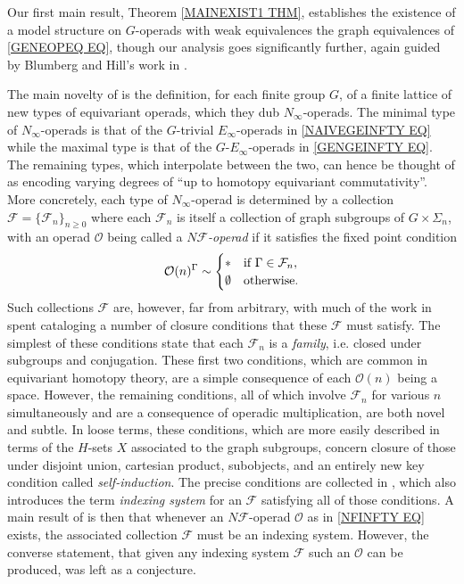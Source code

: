 \documentclass[a4paper,10pt
,draft
]{article}%
\numberwithin{equation}{section}
\numberwithin{figure}{section}
\theoremstyle{definition} %
\newcommand{\set}[1]{\left\{#1\right\}}%
\renewcommand{\O}{\ensuremath{\mathcal O}}
\newcommand{\1}{\ensuremath{\mathbbm 1}}%
\begin{document}
Our first main result, Theorem \ref{MAINEXIST1 THM}, 
establishes the existence of a model structure on $G$-operads with weak equivalences the graph equivalences of \eqref{GENEOPEQ EQ},
though our analysis goes significantly further, again guided by Blumberg and Hill's work in \cite{BH15}.

The main novelty of \cite{BH15} is the definition, for each finite group $G$, of a finite lattice of new types of equivariant operads, which they dub $N_{\infty}$-operads.
The minimal type of $N_{\infty}$-operads is that of the 
$G$-trivial $E_{\infty}$-operads in \eqref{NAIVEGEINFTY EQ} 
while the maximal type is that of the $G$-$E_{\infty}$-operads in \eqref{GENGEINFTY EQ}.
The remaining types, which interpolate between 
the two,
can hence be thought of as encoding varying degrees of ``up to homotopy equivariant commutativity''.
More concretely, each type of $N_{\infty}$-operad is determined by a collection
$\mathcal{F} = \{\mathcal{F}_n\}_{n \geq 0}$
\index{F@$\mathcal F = \set{\mathcal F_n}_{n \geq 0}$}
where each $\mathcal{F}_n$ is itself a collection of graph subgroups of $G \times \Sigma_n$,
with an operad $\O$ being called a
\textit{$N \mathcal{F}$-operad} if it satisfies the fixed point condition
\begin{equation}\label{NFINFTY EQ}
	\O(n)^{\Gamma} \sim 
\begin{cases}
	\** & \text{if } \Gamma \in \mathcal{F}_n,
\\
	\emptyset & \text{otherwise}.
\end{cases}
\end{equation}
Such collections $\mathcal{F}$ are, however, far from arbitrary, with much of the work in \cite[\S 3]{BH15} spent cataloging a number of closure conditions that these $\mathcal{F}$ must satisfy.
The simplest of these conditions
state that each $\mathcal{F}_n$ is a \textit{family}, i.e. closed under subgroups and conjugation. These first two conditions, which are common in equivariant homotopy theory,
are a simple consequence of each $\O(n)$ being a space.
However, the remaining conditions, 
all of which involve $\mathcal{F}_n$ for various $n$ simultaneously and are a consequence of operadic multiplication,
are both novel and subtle.
In loose terms, these conditions, 
which are more easily described in terms of the 
$H$-sets $X$ associated to the graph subgroups,
concern closure of those under 
disjoint union, cartesian product, subobjects,
and an entirely new key condition called \textit{self-induction}.
The precise conditions are collected in
\cite[Def. 3.22]{BH15},
which also introduces the term \textit{indexing system} for 
an $\mathcal{F}$ satisfying all of those conditions.
A main result of \cite[\S 4]{BH15} is then that whenever an $N\mathcal F$-operad $\O$ as in \eqref{NFINFTY EQ} exists,
the associated collection $\mathcal{F}$ must be an indexing system.
However, the converse statement, that given any indexing system $\mathcal{F}$ such an $\O$ can be produced, was left as a conjecture.
\end{document}
